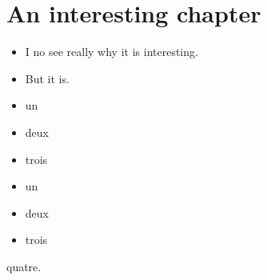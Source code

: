 \chapter{An interesting chapter}
\label{s:1}
\begin{itemize}
\item I no see really why it is interesting.
\item But it is.
\end{itemize}
\begin{itemize}
\item un
\item deux

\item trois
\end{itemize}

\begin{itemize}
\item un
\item deux
\item trois
\end{itemize}
quatre.

